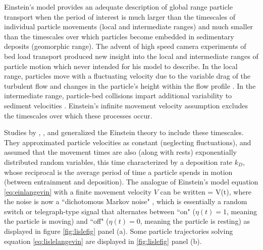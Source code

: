 Einstein's model provides an adequate description of global range particle transport when the period of interest is much larger than the timescales of individual particle movements (local and intermediate ranges) and much smaller than the timescales over which particles become embedded in sedimentary deposits (geomorphic range).
The advent of high speed camera experiments of bed load transport produced new insight into the local and intermediate ranges of particle motion \citep{Abbott1970,Francis1972,Drake1988} which \citet{Einstein1937} never intended for his model to describe.
In the local range, particles move with a fluctuating velocity due to the variable drag of the turbulent flow \citep{Lajeunesse2010,Fathel2015} and changes in the particle's height within the flow profile \citep{VanRijn1984,Wiberg1985}. In the intermediate range, particle-bed collisions impart additional variability to sediment velocities \citep{Gordon1972,Martin2013}.
Einstein's infinite movement velocity assumption excludes the timescales over which these processes occur.

Studies by \citet{Gordon1972}, \citet{Lisle1998}, and \citet{Lajeunesse2017} generalized the Einstein theory to include these timescales. They approximated particle velocities as constant (neglecting fluctuations), and assumed that the movement times are also (along with rests) exponentially distributed random variables, this time characterized by a deposition rate $k_D$, whose reciprocal is the average period of time a particle spends in motion (between entrainment and deposition).
The analogue of Einstein's model equation \ref{eq:einlangevin} with a finite movement velocity $V$ can be written
\be {} = V\eta(t), \ee
where the noise is now a ``dichotomous Markov noise" \citep{Bena2006}, which is essentially a random switch or telegraph-type signal that alternates between ``on" ($\eta(t) = 1$, meaning the particle is moving) and ``off" ($\eta(t) = 0$, meaning the particle is resting) \citep{Cox1965,Horsthemke1984, Masoliver1991, Masoliver1996} as displayed in figure \ref{fig:lislefig} panel (a). Some particle trajectories solving equation \ref{eq:lislelangevin} are displayed in \ref{fig:lislefig} panel (b).

